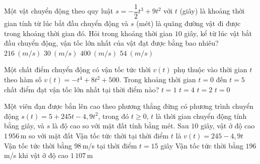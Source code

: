 \begin{ex}%
	Một vật chuyển động theo quy luật $s = -\dfrac{1}{2}t^3 + 9t^2$ với $t$ (giây) là khoảng thời gian tính từ lúc bắt đầu chuyển động và $s$ (mét) là quãng đường vật đi được trong khoảng thời gian đó. Hỏi trong khoảng thời gian $10$ giây, kể từ lúc vật bắt đầu  chuyển động, vận tốc lớn nhất của vật đạt được bằng bao nhiêu?
	 \choice
		{$216~\left(m/s  \right)$}
		{$30~\left(m/s \right)$} 
		{$400~\left(m/s \right)$} 
		{\True $54~\left(m/s  \right)$}
\end{ex}

\begin{ex}%
	Một chất điểm chuyển động có vận tốc tức thời $v(t)$ phụ thuộc vào thời  gian $t$ theo hàm số $v(t)=-t^4+8t^2+500$. Trong khoảng thời gian $t=0$ đến $t=5$ chất điểm đạt vận tốc lớn nhất tại thời điểm nào?
	 \choice
		 {$t=1$}
		 {$t=4$}
		{\True $t=2$} 
		 {$t=0$}
\end{ex}

\begin{ex}%
	 Một viên đạn được bắn lên cao theo phương thẳng đứng có phương trình chuyển động $s(t)=5+245t-4{,}9t^2$, trong đó $t\ge 0$, $t$ là thời gian chuyển động tính bằng giây, và $s$ là độ cao so với mặt đất tính bằng mét.
	\choiceTF 
		{Sau $10$ giây, vật ở  độ cao $1\,956$\,m so với mặt đất}
		 {Vận tốc tức thời tại thời điểm $t$ là $v(t)=245-4{,}9t$}
		{\True Vận tốc tức thời bằng $98$\,m/s tại thời  điểm $t=15$ giây}
		{Vận tốc tức  thời bằng $196$ m/s khi vật ở độ cao $1\,107$\,m}
\end{ex}

